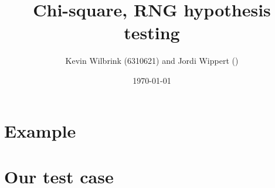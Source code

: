 \documentclass[12pt]{article}
\title{\textbf{Chi-square, RNG hypothesis testing}}
\date{\today}
\author{Kevin Wilbrink (6310621) and Jordi Wippert ()}
\begin{document}
	\maketitle

	\begin{multicols*}{2}
		\section{Example}
		
		\section{Our test case}
		
	\end{multicols*}
\end{document}
